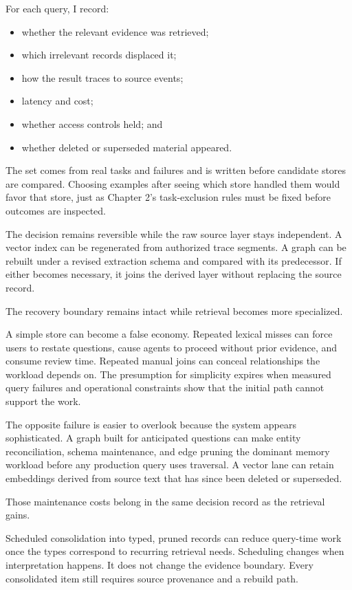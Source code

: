 
For each query, I record:

\begin{itemize}
\tightlist
\item
  whether the relevant evidence was retrieved;
\item
  which irrelevant records displaced it;
\item
  how the result traces to source events;
\item
  latency and cost;
\item
  whether access controls held; and
\item
  whether deleted or superseded material appeared.
\end{itemize}

The set comes from real tasks and failures and is written before candidate stores are compared. Choosing examples after seeing which store handled them would favor that store, just as Chapter 2's task-exclusion rules must be fixed before outcomes are inspected.

The decision remains reversible while the raw source layer stays independent. A vector index can be regenerated from authorized trace segments. A graph can be rebuilt under a revised extraction schema and compared with its predecessor. If either becomes necessary, it joins the derived layer without replacing the source record.

The recovery boundary remains intact while retrieval becomes more specialized.

A simple store can become a false economy. Repeated lexical misses can force users to restate questions, cause agents to proceed without prior evidence, and consume review time. Repeated manual joins can conceal relationships the workload depends on. The presumption for simplicity expires when measured query failures and operational constraints show that the initial path cannot support the work.

The opposite failure is easier to overlook because the system appears sophisticated. A graph built for anticipated questions can make entity reconciliation, schema maintenance, and edge pruning the dominant memory workload before any production query uses traversal. A vector lane can retain embeddings derived from source text that has since been deleted or superseded.

Those maintenance costs belong in the same decision record as the retrieval gains.

Scheduled consolidation into typed, pruned records can reduce query-time work once the types correspond to recurring retrieval needs. Scheduling changes when interpretation happens. It does not change the evidence boundary. Every consolidated item still requires source provenance and a rebuild path.

